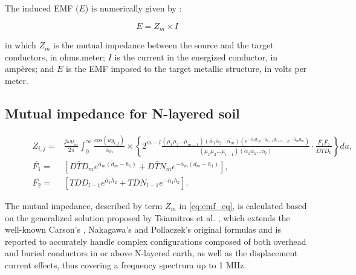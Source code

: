 \documentclass{IEEEtran4PSCC}
\begin{document}
The induced EMF ($E$) is numerically given by \cite{CIGREWG36}:

\begin{equation}
		E = Z_{m} \times I
		\label{eq:emf_eq}
\end{equation}

\noindent in which $Z_{m}$ is the mutual impedance between the source and the target conductors, in ohms.meter; $I$ is the current in the energized conductor, in ampères; and $E$ is the EMF imposed to the target metallic structure, in volts per meter.

\subsection{Mutual impedance for N-layered soil}

\begin{figure}[b]
	\hrulefill
	\begin{equation}\label{eq:Zij}
		\begin{aligned}
			Z_{i,j} = {} & \frac{j\omega\mu_{m}}{2\pi}\int_{0}^{\infty} \frac{cos(uy_{i,j})}{\bar\alpha_{m}} \times \left\{2^{m-l}\frac{(\mu_{1}\mu_{2}\dots\mu_{m-1})(\bar\alpha_{1}\bar\alpha_{2}\dots\bar\alpha_{m})(e^{-\bar\alpha_{l}d_{l}}e^{-\bar\alpha_{l+1}d_{l+1}}\dots e^{-\bar\alpha_{m}d_{m}})}{(\mu_{1}\mu_{2}\dots\mu_{l-1})(\bar\alpha_{1}\bar\alpha_{2}\dots\bar\alpha_{l})}\cdot\frac{\bar{F_{1}}\bar{F_{2}}}{D\bar{T}D_{0}}\right\}du,	\\
			\bar{F_{1}} = {} & [D\bar{T}D_{m} e^{\bar{\alpha}_{m}(d_{m}-h_{1})} + D\bar{T}N_{m}e^{-\bar{\alpha}_{m}(d_{m}-h_{1})}], \\			
			\bar{F_{2}} = {} & [T\bar{D}D_{l-1}e^{\bar{\alpha}_{1}h_{2}} + T\bar{D}N_{l-1}e^{-\bar{\alpha}_{1}h_{2}}].
		\end{aligned}
	\end{equation}
\end{figure}


The mutual impedance, described by term $Z_{m}$ in \eqref{eq:emf_eq}, is calculated based on the generalized solution proposed by Tsiamitros et al. \cite{Tsiamitros2008a}, which extends the well-known Carson's \cite{Carson1926}, Nakagawa's \cite{Nakagawa} and Pollaczek's \cite{Pollaczek1926} original formulas and is reported to accurately handle complex configurations composed of both overhead and buried conductors in or above N-layered earth, as well as the displacement current effects, thus covering a frequency spectrum up to 1 MHz. 
\end{document}
